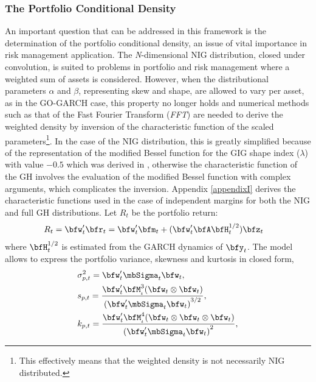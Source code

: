 \subsubsection{The Portfolio Conditional Density}\label{III}
An important question that can be addressed in this framework is the determination
of the portfolio conditional density, an issue of vital importance in risk
management application. The \emph{N}-dimensional NIG distribution, closed under
convolution, is suited to problems in portfolio and risk management where a
weighted sum of assets is considered. However, when the distributional parameters
$\alpha$ and $\beta$, representing skew and shape, are allowed to vary per asset,
as in the GO-GARCH case, this property no longer holds and numerical methods
such as that of the Fast Fourier Transform (\emph{FFT}) are needed to derive the
weighted density by inversion of the characteristic function of the scaled
parameters\footnote{This effectively means that the weighted density is not
necessarily NIG distributed.}. In the case of the NIG distribution, this is greatly
simplified because of the representation of the modified Bessel function for the GIG
shape index ($\lambda$) with value $-0.5$ which was derived in \cite{Barndorff-Nielsen1981},
otherwise the characteristic function of the GH involves the evaluation of the
modified Bessel function with complex arguments, which complicates the inversion.
Appendix \ref{appendixI} derives the characteristic functions used in the case
of independent margins for both the NIG and full GH distributions. Let $R_t$ be
the portfolio return:
\begin{align}\label{eq:portfolio1}
{R_t} & =  \bfw'_t \bfr_t = \bfw'_t \bfm_t + (\bfw_t' \bfA \bfH_t^{1/2}){\bfz_t}
\end{align}
where $\bfH _t^{1/2}$ is estimated from the GARCH dynamics of $\bfy_t$. The model
allows to express the portfolio variance, skewness and kurtosis in closed form,
\begin{equation}\label{eq:portfolio5}
\begin{gathered}
  \sigma_{{p,t}}^2 = \bfw_t'{\mbSigma_{t}}\bfw_t, \hfill \\
  {s_{p,t}} = \frac{{\bfw_t'\bfM_{_t}^3(\bfw_t \otimes \bfw_t)}}{{{{(\bfw_t'{\mbSigma _{t}}\bfw_t)}^{3/2}}}}, \hfill \\
  {k_{p,t}} = \frac{{\bfw_t'\bfM_{_t}^4(\bfw_t \otimes \bfw_t \otimes \bfw_t)}}{{{{(\bfw_t'{\mbSigma_{t}}\bfw_t)}^2}}}, \hfill \\
\end{gathered}
\end{equation}
